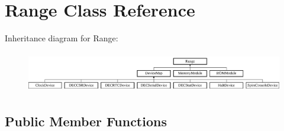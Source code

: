 \hypertarget{classRange}{
\section{Range Class Reference}
\label{classRange}
}
Inheritance diagram for Range:\begin{figure}[H]
\begin{center}
\leavevmode
\includegraphics[height=1.80451cm]{classRange}
\end{center}
\end{figure}
\subsection*{Public Member Functions}

